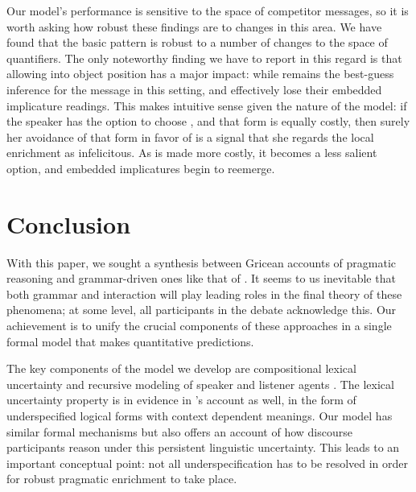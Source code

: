 \documentclass[leqno,12pt]{article}
\begin{document}
Our model's performance is sensitive to the space of competitor
messages, so it is worth asking how robust these findings are to
changes in this area. We have found that the basic pattern is robust
to a number of changes to the space of quantifiers.  The only
noteworthy finding we have to report in this regard is that allowing
 into object position has a major impact: while
 remains the best-guess inference for the message
 in this setting,  and
 effectively lose their embedded implicature
readings.  This makes intuitive sense given the nature of the model:
if the speaker has the option to choose , and that form is equally costly, then surely her avoidance
of that form in favor of  is a signal that she
regards the local enrichment as infelicitous. As  is
made more costly, it becomes a less salient option, and embedded
implicatures begin to reemerge.


\section{Conclusion}\label{sec:conclusion}

With this paper, we sought a synthesis between Gricean accounts of
pragmatic reasoning and grammar-driven ones like that of
\citet{ChierchiaFoxSpector08}. It seems to us inevitable that both
grammar and interaction will play leading roles in the final theory of
these phenomena; at some level, all participants in the debate
acknowledge this. Our achievement is to unify the crucial components
of these approaches in a single formal model that makes quantitative
predictions.

The key components of the model we develop are compositional lexical
uncertainty and recursive modeling of speaker and listener agents
\citep{Bergen:Levy:Goodman:2014}. The lexical uncertainty property is
in evidence in \citeauthor{ChierchiaFoxSpector08}'s account as well,
in the form of underspecified logical forms with context dependent
meanings. Our model has similar formal mechanisms but also offers an
account of how discourse participants reason under this persistent
linguistic uncertainty. This leads to an important conceptual point:
not all underspecification has to be resolved in order for robust
pragmatic enrichment to take place.
\end{document}
